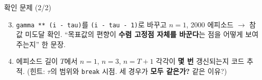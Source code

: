 \begin{frame}{확인 문제 (2/2)}
  \begin{enumerate}
    \setcounter{enumi}{2}
    \item {} \texttt{gamma ** (i - tau)}를
      \texttt{(i - tau - 1)}로 바꾸고 $n=1$, 2000 에피소드 $\to$ 참값
      미도달 확인. ``목표값의 편향이 \textbf{수렴 고정점 자체를
      바꾼다}는 점을 어떻게 보여주는지'' 한 문장.
    \item {} 에피소드 길이 $T$에서
      $n=1$, $n=3$, $n=T+1$ 각각이 \textbf{몇 번} 갱신되는지 코드
      추적. (힌트: $\tau$의 범위와 \texttt{break} 시점. 세 경우가
      \textbf{모두 같은가?} 같은 이유?)
  \end{enumerate}
\end{frame}
